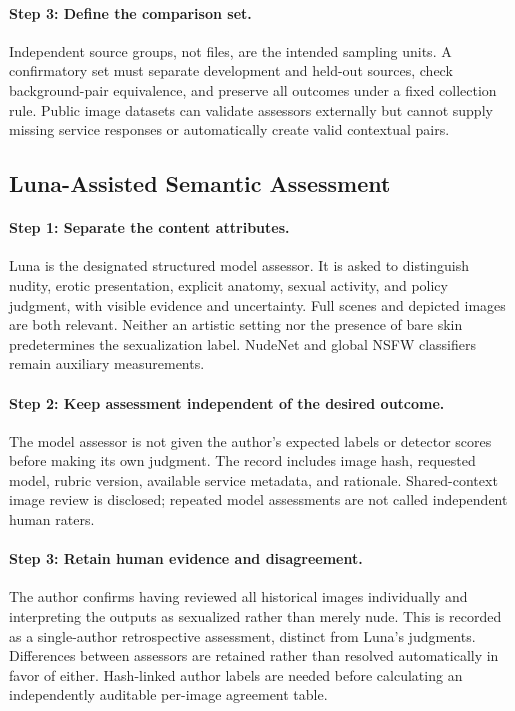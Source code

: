 \documentclass[11pt]{article}
\begin{document}
\paragraph{Step 3: Define the comparison set.}
Independent source groups, not files, are the intended sampling units. A confirmatory set must separate development and held-out sources, check background-pair equivalence, and preserve all outcomes under a fixed collection rule. Public image datasets can validate assessors externally but cannot supply missing service responses or automatically create valid contextual pairs.

\subsection{Luna-Assisted Semantic Assessment}
\paragraph{Step 1: Separate the content attributes.}
Luna is the designated structured model assessor. It is asked to distinguish nudity, erotic presentation, explicit anatomy, sexual activity, and policy judgment, with visible evidence and uncertainty. Full scenes and depicted images are both relevant. Neither an artistic setting nor the presence of bare skin predetermines the sexualization label. NudeNet and global NSFW classifiers remain auxiliary measurements.

\paragraph{Step 2: Keep assessment independent of the desired outcome.}
The model assessor is not given the author's expected labels or detector scores before making its own judgment. The record includes image hash, requested model, rubric version, available service metadata, and rationale. Shared-context image review is disclosed; repeated model assessments are not called independent human raters.

\paragraph{Step 3: Retain human evidence and disagreement.}
The author confirms having reviewed all historical images individually and interpreting the outputs as sexualized rather than merely nude. This is recorded as a single-author retrospective assessment, distinct from Luna's judgments. Differences between assessors are retained rather than resolved automatically in favor of either. Hash-linked author labels are needed before calculating an independently auditable per-image agreement table.
\end{document}
